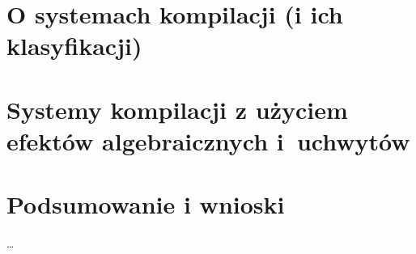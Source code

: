 \documentclass[lic,declaration,shortabstract]{iithesis}
\author         {Jakub Mendyk}
\date          {4 września 2020}                     %
\begin{document}





\chapter{O systemach kompilacji (i ich klasyfikacji)}



\chapter{Systemy kompilacji z użyciem efektów algebraicznych i~uchwytów}

\chapter{Podsumowanie i wnioski}

\ldots


\nocite{biernacki2017handle}
\nocite{biernacki2019abstracting}
\nocite{biernacki2019binders}
\nocite{pietersgeneralized}
\nocite{mcbride2012frank}



\end{document}
